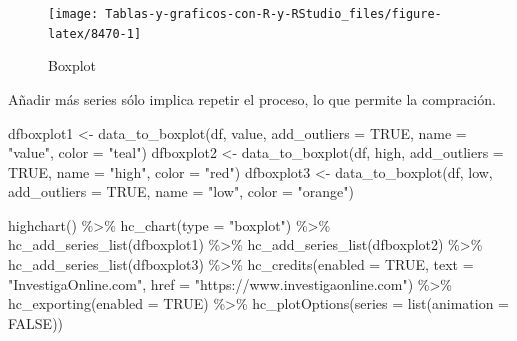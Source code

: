 \documentclass[
]{book}
\newenvironment{Shaded}{\begin{snugshade}}{\end{snugshade}}
\newcommand{\AttributeTok}[1]{\textcolor[rgb]{0.77,0.63,0.00}{#1}}
\newcommand{\ConstantTok}[1]{\textcolor[rgb]{0.00,0.00,0.00}{#1}}
\newcommand{\FunctionTok}[1]{\textcolor[rgb]{0.00,0.00,0.00}{#1}}
\newcommand{\NormalTok}[1]{#1}
\newcommand{\OtherTok}[1]{\textcolor[rgb]{0.56,0.35,0.01}{#1}}
\newcommand{\SpecialCharTok}[1]{\textcolor[rgb]{0.00,0.00,0.00}{#1}}
\newcommand{\StringTok}[1]{\textcolor[rgb]{0.31,0.60,0.02}{#1}}
\begin{document}
\begin{figure}[H]

{\centering \texttt{[image: Tablas-y-graficos-con-R-y-RStudio\_files/figure-latex/8470-1]} 

}

\caption{Boxplot}\label{fig:8470}
\end{figure}

Añadir más series sólo implica repetir el proceso, lo que permite la compración.

\begin{Shaded}
\begin{Highlighting}[]
\NormalTok{dfboxplot1 }\OtherTok{\textless{}{-}} \FunctionTok{data\_to\_boxplot}\NormalTok{(df, value, }\AttributeTok{add\_outliers =} \ConstantTok{TRUE}\NormalTok{,}
  \AttributeTok{name =} \StringTok{"value"}\NormalTok{, }\AttributeTok{color =} \StringTok{"teal"}\NormalTok{)}
\NormalTok{dfboxplot2 }\OtherTok{\textless{}{-}} \FunctionTok{data\_to\_boxplot}\NormalTok{(df, high, }\AttributeTok{add\_outliers =} \ConstantTok{TRUE}\NormalTok{,}
  \AttributeTok{name =} \StringTok{"high"}\NormalTok{, }\AttributeTok{color =} \StringTok{"red"}\NormalTok{)}
\NormalTok{dfboxplot3 }\OtherTok{\textless{}{-}} \FunctionTok{data\_to\_boxplot}\NormalTok{(df, low, }\AttributeTok{add\_outliers =} \ConstantTok{TRUE}\NormalTok{,}
  \AttributeTok{name =} \StringTok{"low"}\NormalTok{, }\AttributeTok{color =} \StringTok{"orange"}\NormalTok{)}

\FunctionTok{highchart}\NormalTok{() }\SpecialCharTok{\%\textgreater{}\%}
  \FunctionTok{hc\_chart}\NormalTok{(}\AttributeTok{type =} \StringTok{"boxplot"}\NormalTok{) }\SpecialCharTok{\%\textgreater{}\%}
  \FunctionTok{hc\_add\_series\_list}\NormalTok{(dfboxplot1) }\SpecialCharTok{\%\textgreater{}\%}
  \FunctionTok{hc\_add\_series\_list}\NormalTok{(dfboxplot2) }\SpecialCharTok{\%\textgreater{}\%}
  \FunctionTok{hc\_add\_series\_list}\NormalTok{(dfboxplot3) }\SpecialCharTok{\%\textgreater{}\%}
  \FunctionTok{hc\_credits}\NormalTok{(}\AttributeTok{enabled =} \ConstantTok{TRUE}\NormalTok{, }\AttributeTok{text =} \StringTok{"InvestigaOnline.com"}\NormalTok{,}
    \AttributeTok{href =} \StringTok{"https://www.investigaonline.com"}\NormalTok{) }\SpecialCharTok{\%\textgreater{}\%}
  \FunctionTok{hc\_exporting}\NormalTok{(}\AttributeTok{enabled =} \ConstantTok{TRUE}\NormalTok{) }\SpecialCharTok{\%\textgreater{}\%}
  \FunctionTok{hc\_plotOptions}\NormalTok{(}\AttributeTok{series =} \FunctionTok{list}\NormalTok{(}\AttributeTok{animation =} \ConstantTok{FALSE}\NormalTok{))}
\end{Highlighting}
\end{Shaded}
\end{document}
